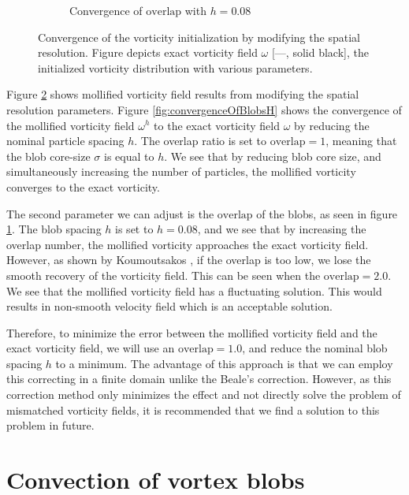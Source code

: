 \begin{figure}[t]
\begin{subfigure}[b]{0.5\textwidth}
                \caption{Convergence of $\mathrm{overlap}$ with $h = 0.08$}
                \label{fig:convergenceOfBlobsOverlap}
        \end{subfigure}
        \caption{Convergence of the vorticity initialization by modifying the spatial resolution. Figure depicts exact vorticity field $\omega$ [---, solid black], the initialized vorticity distribution with various parameters.}
        \label{fig:convergenceOfSpatialResolution}
\end{figure}	

Figure \ref{fig:convergenceOfSpatialResolution} shows mollified vorticity field results from modifying the spatial resolution parameters. Figure \ref{fig:convergenceOfBlobsH} shows the convergence of the mollified vorticity field $\omega^h$ to the exact vorticity field $\omega$ by reducing the nominal particle spacing $h$. The overlap ratio is set to $\mathrm{overlap} = 1$, meaning that the blob core-size $\sigma$ is equal to $h$. We see that by reducing blob core size, and simultaneously increasing the number of particles, the mollified vorticity converges to the exact vorticity. 

The second parameter we can adjust is the $\mathrm{overlap}$ of the blobs, as seen in figure \ref{fig:convergenceOfBlobsOverlap}. The blob spacing $h$ is set to $h = 0.08$, and we see that by increasing the overlap number, the mollified vorticity approaches the exact vorticity field. However, as shown by Koumoutsakos \cite{Cottet2000a}, if the overlap is too low, we lose the smooth recovery of the vorticity field. This can be seen when the $\mathrm{overlap} = 2.0$. We see that the mollified vorticity field has a fluctuating solution. This would results in non-smooth velocity field which is an acceptable solution.

Therefore, to minimize the error between the mollified vorticity field and the exact vorticity field, we will use an $\mathrm{overlap} = 1.0$, and reduce the nominal blob spacing $h$ to a minimum. The advantage of this approach is that we can employ this correcting in a finite domain unlike the Beale's correction. However, as this correction method only minimizes the effect and not directly solve the problem of mismatched vorticity fields, it is recommended that we find a solution to this problem in future.

\section{Convection of vortex blobs}


